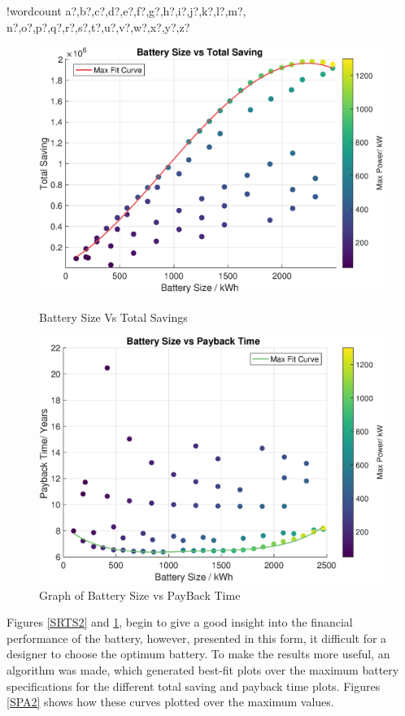 \documentclass[fontsize=9.5pt]{extarticle}
\numberwithin{figure}{section} %
\newcounter{words}
\newenvironment{counted}{%
  \setcounter{words}{0}
  \SearchList!{wordcount}{\stepcounter{words}}
    {a?,b?,c?,d?,e?,f?,g?,h?,i?,j?,k?,l?,m?,
    n?,o?,p?,q?,r?,s?,t?,u?,v?,w?,x?,y?,z?}
  \UndoBoundary{'}
  \SearchOrder{p;}}{%
  \StopSearching}
\begin{document}
\begin{counted}
\begin{figure}[H]
\centering
\begin{minipage}{.495\textwidth}
  \centering
   \includegraphics[trim = 0 0 0 0, clip, width=1\textwidth]{batsts.eps}
 \caption{Battery Size Vs Total Savings}
 \label{SRTS2}
\end{minipage}
\hfill
\begin{minipage}{.495\textwidth}
  \centering
\includegraphics[trim = 0 0 0 0, clip, width=1\textwidth]{batspb.eps}
   \caption{Graph of Battery Size vs PayBack Time}
  \label{SRPB2}
\end{minipage}
\vspace{-10pt}
\end{figure}

Figures \ref{SRTS2} and \ref{SRPB2}, begin to give a good insight into
the financial performance of the battery, however, presented in this
form, it difficult for a designer to choose the optimum battery. To make
the results more useful, an algorithm was made, which generated best-fit
plots over the maximum battery specifications for the different total
saving and payback time plots. Figures \ref{SPA2} shows how these curves
plotted over the maximum values.


\end{counted}
\end{document}
